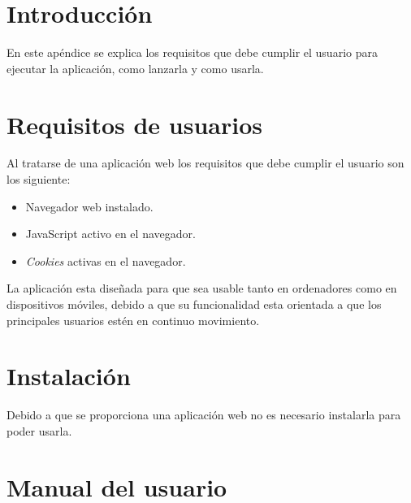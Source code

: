 
\section{Introducción}
En este apéndice se explica los requisitos que debe cumplir el usuario para ejecutar la aplicación, como lanzarla y como usarla.

\section{Requisitos de usuarios}
Al tratarse de una aplicación web los requisitos que debe cumplir el usuario son los siguiente:
\begin{itemize}
	\item Navegador web instalado.
	\item JavaScript activo en el navegador.
	\item \textit{Cookies} activas en el navegador.
\end{itemize}

La aplicación esta diseñada para que sea usable tanto en ordenadores como en dispositivos móviles, debido a que su funcionalidad esta orientada a que los principales usuarios estén en continuo movimiento.

\section{Instalación}
Debido a que se proporciona una aplicación web no es necesario instalarla para poder usarla.

\section{Manual del usuario}


